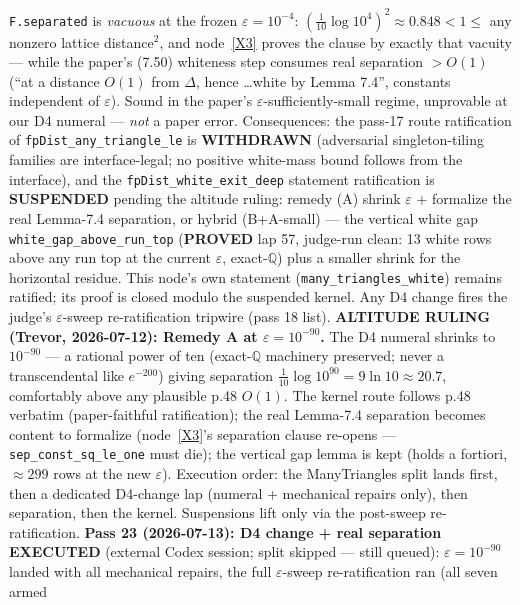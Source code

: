 \begin{lemma}
\texttt{F.separated} is \emph{vacuous} at the frozen \(\varepsilon = 10^{-4}\):
\((\tfrac{1}{10}\log 10^4)^2 \approx 0.848 < 1 \le\) any nonzero lattice
distance\(^2\), and node~\ref{X3} proves the clause by exactly that vacuity --- while
the paper's (7.50) whiteness step consumes real separation \(> O(1)\) (``at a distance
\(O(1)\) from \(\Delta\), hence \dots white by Lemma 7.4'', constants independent of
\(\varepsilon\)).  Sound in the paper's \(\varepsilon\)-sufficiently-small regime,
unprovable at our D4 numeral --- \emph{not} a paper error.  Consequences: the pass-17
route ratification of \texttt{fpDist\_any\_triangle\_le} is \textbf{WITHDRAWN}
(adversarial singleton-tiling families are interface-legal; no positive white-mass
bound follows from the interface), and the \texttt{fpDist\_white\_exit\_deep}
statement ratification is \textbf{SUSPENDED} pending the altitude ruling: remedy (A)
shrink \(\varepsilon\) + formalize the real Lemma-7.4 separation, or hybrid
(B+A-small) --- the vertical white gap \texttt{white\_gap\_above\_run\_top}
(\textbf{PROVED} lap 57, judge-run clean: 13 white rows above any run top at the
current \(\varepsilon\), exact-\(\mathbb{Q}\)) plus a smaller shrink for the
horizontal residue.  This node's own statement (\texttt{many\_triangles\_white})
remains ratified; its proof is closed modulo the suspended kernel.  Any D4 change
fires the judge's \(\varepsilon\)-sweep re-ratification tripwire (pass 18 list).
\textbf{ALTITUDE RULING (Trevor, 2026-07-12): Remedy A at \(\varepsilon = 10^{-90}\).}
The D4 numeral shrinks to \(10^{-90}\) --- a rational power of ten (exact-\(\mathbb{Q}\)
machinery preserved; never a transcendental like \(e^{-200}\)) giving separation
\(\tfrac{1}{10}\log 10^{90} = 9\ln 10 \approx 20.7\), comfortably above any plausible
p.48 \(O(1)\).  The kernel route follows p.48 verbatim (paper-faithful ratification);
the real Lemma-7.4 separation becomes content to formalize (node~\ref{X3}'s separation
clause re-opens --- \texttt{sep\_const\_sq\_le\_one} must die); the vertical gap lemma
is kept (holds a fortiori, \(\approx 299\) rows at the new \(\varepsilon\)).  Execution
order: the ManyTriangles split lands first, then a dedicated D4-change lap (numeral +
mechanical repairs only), then separation, then the kernel.  Suspensions lift only via
the post-sweep re-ratification.
\textbf{Pass 23 (2026-07-13): D4 change + real separation EXECUTED} (external Codex
session; split skipped --- still queued): \(\varepsilon = 10^{-90}\) landed with all
mechanical repairs, the full \(\varepsilon\)-sweep re-ratification ran (all seven armed

\end{lemma}
